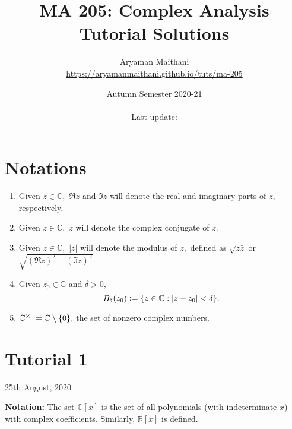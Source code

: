 \documentclass[12pt]{article}
\title{MA 205: Complex Analysis\\\large{Tutorial Solutions}}
\author{Aryaman Maithani\\\url{https://aryamanmaithani.github.io/tuts/ma-205}}
\date{Autumn Semester 2020-21\\~\\Last update: \DTMnow}
\theoremstyle{definition}
\numberwithin{thm}{section}
\begin{document}
\maketitle
\tableofcontents
\newpage
\setcounter{section}{-1}
\section{Notations}
\begin{enumerate}
	\item Given $z \in \mathbb{C},$ $\Re z$ and $\Im z$ will denote the real and imaginary parts of $z,$ respectively.
	\item Given $z \in \mathbb{C},$ $\bar{z}$ will denote the complex conjugate of $z.$
	\item Given $z \in \mathbb{C},$ $\left|z\right|$ will denote the modulus of $z,$ defined as $\sqrt{z\bar{z}}$ or $\sqrt{\left(\Re z\right)^2 + \left(\Im z\right)^2}.$
	\item Given $z_0 \in \mathbb{C}$ and $\delta > 0,$
	\begin{equation*} 
		B_\delta(z_0) \vcentcolon= \{z \in \mathbb{C} : |z - z_0| < \delta\}.
	\end{equation*}
	\item $\mathbb{C}^\times \vcentcolon= \mathbb{C}\setminus\{0\},$ the set of nonzero complex numbers.
\end{enumerate}
\newpage\section{Tutorial 1}
\begin{center}
	25th August, 2020
\end{center}
\textbf{Notation:} The set $\mathbb{C}[x]$ is the set of all polynomials (with indeterminate $x$) with complex coefficients. Similarly, $\mathbb{R}[x]$ is defined.
\end{document}
